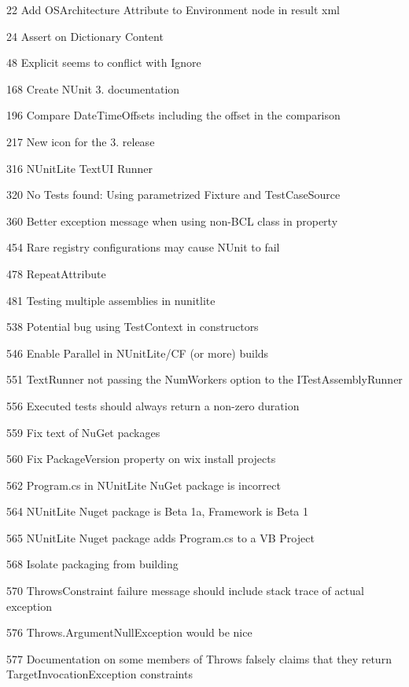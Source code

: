 \begin{DoxyItemize}
\item 22 Add O\+S\+Architecture Attribute to Environment node in result xml
\item 24 Assert on Dictionary Content
\item 48 Explicit seems to conflict with Ignore
\item 168 Create N\+Unit 3. documentation
\item 196 Compare Date\+Time\+Offsets including the offset in the comparison
\item 217 New icon for the 3. release
\item 316 N\+Unit\+Lite Text\+UI Runner
\item 320 No Tests found\+: Using parametrized Fixture and Test\+Case\+Source
\item 360 Better exception message when using non-\/\+B\+CL class in property
\item 454 Rare registry configurations may cause N\+Unit to fail
\item 478 Repeat\+Attribute
\item 481 Testing multiple assemblies in nunitlite
\item 538 Potential bug using Test\+Context in constructors
\item 546 Enable Parallel in N\+Unit\+Lite/\+CF (or more) builds
\item 551 Text\+Runner not passing the Num\+Workers option to the I\+Test\+Assembly\+Runner
\item 556 Executed tests should always return a non-\/zero duration
\item 559 Fix text of Nu\+Get packages
\item 560 Fix Package\+Version property on wix install projects
\item 562 Program.\+cs in N\+Unit\+Lite Nu\+Get package is incorrect
\item 564 N\+Unit\+Lite Nuget package is Beta 1a, Framework is Beta 1
\item 565 N\+Unit\+Lite Nuget package adds Program.\+cs to a VB Project
\item 568 Isolate packaging from building
\item 570 Throws\+Constraint failure message should include stack trace of actual exception
\item 576 Throws.\+Argument\+Null\+Exception would be nice
\item 577 Documentation on some members of Throws falsely claims that they return {\ttfamily Target\+Invocation\+Exception} constraints

\end{DoxyItemize}

